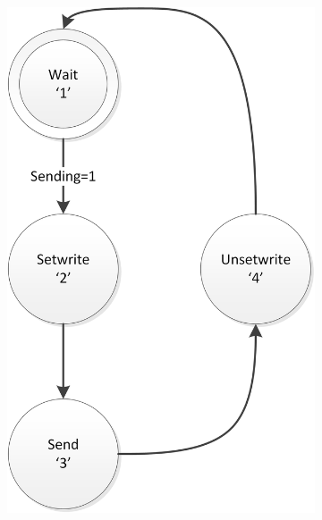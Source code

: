 \documentclass{report}
\begin{document}
\begin{appendices}
\begin{figure}[H]
\begin{subfigure}{0.40\linewidth}
\includegraphics[width=\linewidth]{FSMSender}
\end{subfigure}
\end{figure}


\end{appendices}
\end{document}
